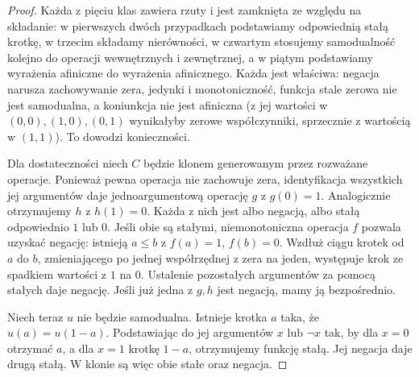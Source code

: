 \begin{proof}
Każda z pięciu klas zawiera rzuty i jest zamknięta
ze względu na składanie: w pierwszych dwóch przypadkach
podstawiamy odpowiednią stałą krotkę, w trzecim składamy
nierówności, w czwartym stosujemy samodualność kolejno
do operacji wewnętrznych i zewnętrznej, a w piątym
podstawiamy wyrażenia afiniczne do wyrażenia afinicznego.
Każda jest właściwa: negacja narusza zachowywanie zera,
jedynki i monotoniczność, funkcja stale zerowa nie jest
samodualna, a koniunkcja nie jest afiniczna
(z jej wartości w $(0,0),(1,0),(0,1)$ wynikałyby
zerowe współczynniki, sprzecznie z wartością w $(1,1)$).
To dowodzi konieczności.

Dla dostateczności niech $C$ będzie klonem generowanym
przez rozważane operacje. Ponieważ pewna operacja
nie zachowuje zera, identyfikacja wszystkich jej argumentów
daje jednoargumentową operację $g$ z $g(0)=1$.
Analogicznie otrzymujemy $h$ z $h(1)=0$.
Każda z nich jest albo negacją, albo stałą
odpowiednio $1$ lub $0$. Jeśli obie są stałymi,
niemonotoniczna operacja $f$ pozwala uzyskać negację:
istnieją $a\leq b$ z $f(a)=1$, $f(b)=0$.
Wzdłuż ciągu krotek od $a$ do $b$, zmieniającego po
jednej współrzędnej z zera na jeden, występuje krok
ze spadkiem wartości z $1$ na $0$.
Ustalenie pozostałych argumentów za pomocą stałych
daje negację. Jeśli już jedna z $g,h$ jest negacją,
mamy ją bezpośrednio.

Niech teraz $u$ nie będzie samodualna. Istnieje
krotka $a$ taka, że $u(a)=u(1-a)$. Podstawiając
do jej argumentów $x$ lub $\neg x$ tak, by dla
$x=0$ otrzymać $a$, a dla $x=1$ krotkę $1-a$,
otrzymujemy funkcję stałą. Jej negacja daje drugą
stałą. W klonie są więc obie stałe oraz negacja.


\end{proof}
